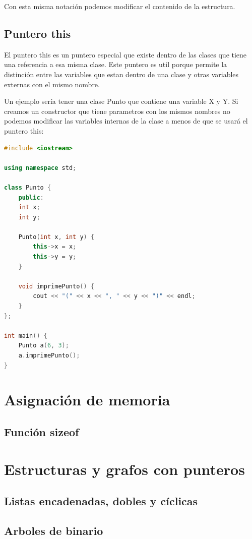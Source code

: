\documentclass{article}
\begin{document}
Con esta misma notación podemos modificar el contenido de la estructura.

\subsection{Puntero this}

El puntero this es un puntero especial que existe dentro de las clases que tiene una referencia a esa misma clase. Este puntero es util porque permite la distinción entre las variables que estan dentro de una clase y otras variables externas con el mismo nombre.

Un ejemplo sería tener una clase Punto que contiene una variable X y Y. Si creamos un constructor que tiene parametros con los mismos nombres no podemos modificar las variables internas de la clase a menos de que se usará el puntero this:

\begin{lstlisting}[language=C++, caption=Puntero this]
#include <iostream>

using namespace std;

class Punto {
    public:
    int x;
    int y;

    Punto(int x, int y) {	
        this->x = x;
        this->y = y;
    }

    void imprimePunto() {
        cout << "(" << x << ", " << y << ")" << endl;
    }
};

int main() {
    Punto a(6, 3);
    a.imprimePunto();
}    
\end{lstlisting}

\section{Asignación de memoria}

\subsection{Función sizeof}

\section{Estructuras y grafos con punteros}

\subsection{Listas encadenadas, dobles y cíclicas}

\subsection{Arboles de binario}
\end{document}

